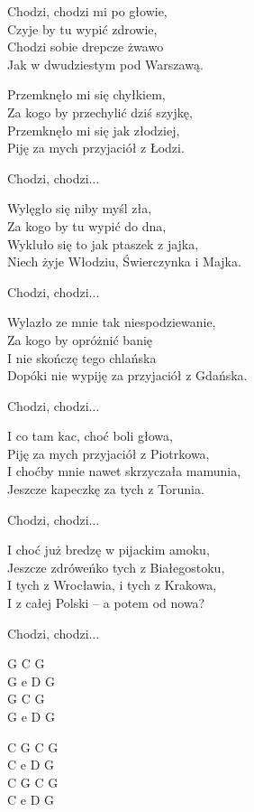 \begin{text}
    \vin Chodzi, chodzi mi po głowie,\\
    \vin Czyje by tu wypić zdrowie,\\
    \vin Chodzi sobie drepcze żwawo\\
    \vin Jak w dwudziestym pod Warszawą.

    Przemknęło mi się chyłkiem,\\
    Za kogo by przechylić dziś szyjkę,\\
    Przemknęło mi się jak złodziej,\\
    Piję za mych przyjaciół z Łodzi.

    \vin Chodzi, chodzi...

    Wylęgło się niby myśl zła,\\
    Za kogo by tu wypić do dna,\\
    Wykluło się to jak ptaszek z jajka,\\
    Niech żyje Włodziu, Świerczynka i Majka.

    \vin Chodzi, chodzi...

    Wylazło ze mnie tak niespodziewanie,\\
    Za kogo by opróżnić banię\\
    I nie skończę tego chlańska\\
    Dopóki nie wypiję za przyjaciół z Gdańska.

    \vin Chodzi, chodzi...

    I co tam kac, choć boli głowa,\\
    Piję za mych przyjaciół z Piotrkowa,\\
    I choćby mnie nawet skrzyczała mamunia,\\
    Jeszcze kapeczkę za tych z Torunia.

    \vin Chodzi, chodzi...

    I choć już bredzę w pijackim amoku,\\
    Jeszcze zdróweńko tych z Białegostoku,\\
    I tych z Wrocławia, i tych z Krakowa,\\
    I z całej Polski – a potem od nowa?

    \vin Chodzi, chodzi...
\end{text}
\begin{chord}
    G C G\\
    G e D G\\
    G C G\\
    G e D G
    
    C G C G\\
    C e D G\\
    C G C G\\
    C e D G    
\end{chord}